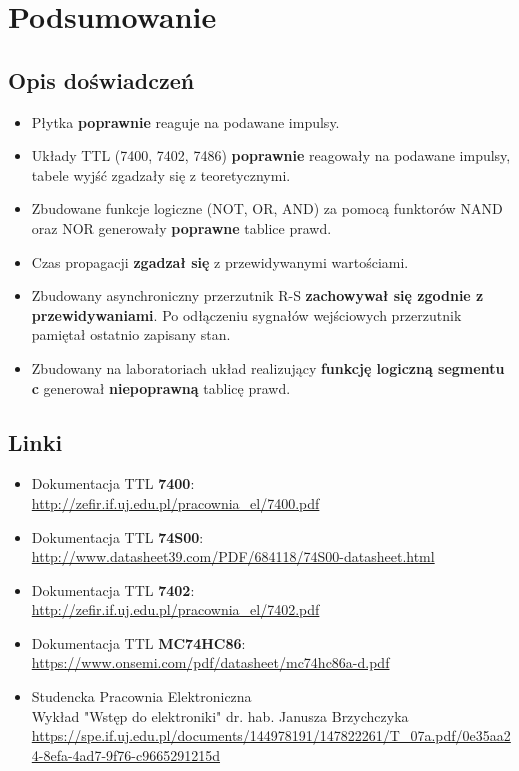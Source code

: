 \chapter{Podsumowanie}

\section{Opis doświadczeń}

\begin{itemize}
    \item Płytka \textbf{poprawnie} reaguje na podawane impulsy.
    \item Układy TTL (7400, 7402, 7486) \textbf{poprawnie} reagowały na podawane impulsy, tabele wyjść zgadzały się z teoretycznymi.
    \item Zbudowane funkcje logiczne (NOT, OR, AND) za pomocą funktorów NAND oraz NOR generowały \textbf{poprawne} tablice prawd.
    \item Czas propagacji \textbf{zgadzał się} z przewidywanymi wartościami.
    \item Zbudowany asynchroniczny przerzutnik R-S \textbf{zachowywał się zgodnie z przewidywaniami}. Po odłączeniu sygnałów wejściowych przerzutnik pamiętał ostatnio zapisany stan.
    \item Zbudowany na laboratoriach układ realizujący \textbf{funkcję logiczną segmentu c} generował \textbf{niepoprawną} tablicę prawd.
\end{itemize}

\section{Linki}
\begin{itemize}
    \item Dokumentacja TTL \textbf{7400}: \\ 
        \label{dokumentacja:7400} \url{http://zefir.if.uj.edu.pl/pracownia_el/7400.pdf}
    \item Dokumentacja TTL \textbf{74S00}: \\
        \label{dokumentacja:74S00} \url{http://www.datasheet39.com/PDF/684118/74S00-datasheet.html}
    \item Dokumentacja TTL \textbf{7402}: \\
        \label{dokumentacja:7402} \url{http://zefir.if.uj.edu.pl/pracownia_el/7402.pdf}
    \item Dokumentacja TTL \textbf{MC74HC86}: \\
        \label{dokumentacja:mc74hc86} \url{https://www.onsemi.com/pdf/datasheet/mc74hc86a-d.pdf}
    \item Studencka Pracownia Elektroniczna \\
        Wykład "Wstęp do elektroniki" dr. hab. Janusza Brzychczyka \\ 
        \url{https://spe.if.uj.edu.pl/documents/144978191/147822261/T_07a.pdf/0e35aa24-8efa-4ad7-9f76-c9665291215d}
\end{itemize}